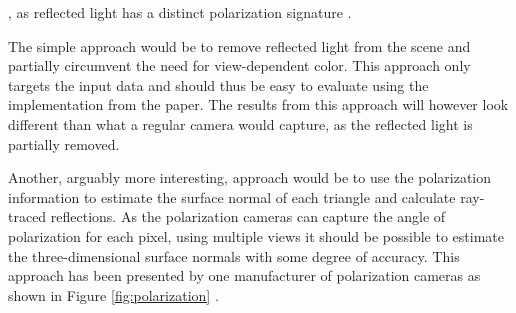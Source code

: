 , as reflected light has a distinct polarization signature \cite{lingUniversityPhysicsVolume2016}.


The simple approach would be to remove reflected light from the scene and partially circumvent the need for view-dependent color.
This approach only targets the input data and should thus be easy to evaluate using the implementation from the paper.
The results from this approach will however look different than what a regular camera would capture, as the reflected light is partially removed.

Another, arguably more interesting, approach would be to use the polarization information to estimate the surface normal of each triangle and calculate ray-traced reflections.
As the polarization cameras can capture the angle of polarization for each pixel, using multiple views it should be possible to estimate the three-dimensional surface normals with some degree of accuracy.
This approach has been presented by one manufacturer of polarization cameras as shown in Figure \ref{fig:polarization} \cite{lucidvisionlabs3DDepthSurface2021}.

